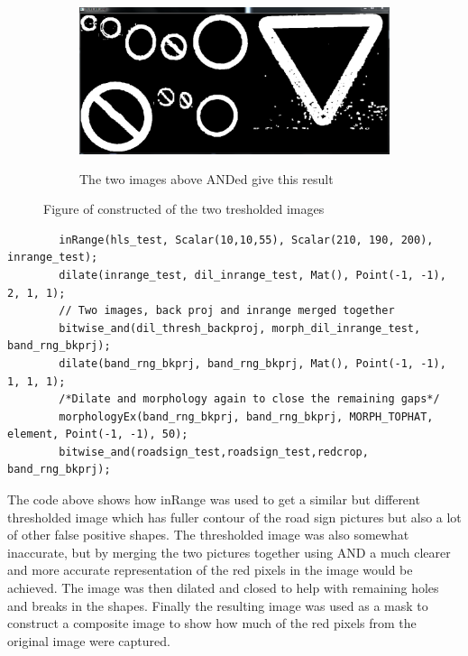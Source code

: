 \documentclass{article}
\begin{document}
\begin{figure}[H]
\center
\begin{subfigure}{0.5\textwidth}
\includegraphics[width=0.9\linewidth, height=5cm]{N_BIT_AND.PNG} 
\caption{The two images above ANDed give this result}
\label{fig:subim1}
\end{subfigure}
\caption{Figure of constructed of the two tresholded images}
\label{fig:image2}
\end{figure}


\begin{lstlisting}
		inRange(hls_test, Scalar(10,10,55), Scalar(210, 190, 200), inrange_test);
		dilate(inrange_test, dil_inrange_test, Mat(), Point(-1, -1), 2, 1, 1);
		// Two images, back proj and inrange merged together
		bitwise_and(dil_thresh_backproj, morph_dil_inrange_test, band_rng_bkprj);
		dilate(band_rng_bkprj, band_rng_bkprj, Mat(), Point(-1, -1), 1, 1, 1);
		/*Dilate and morphology again to close the remaining gaps*/
		morphologyEx(band_rng_bkprj, band_rng_bkprj, MORPH_TOPHAT, element, Point(-1, -1), 50);
		bitwise_and(roadsign_test,roadsign_test,redcrop, band_rng_bkprj);
\end{lstlisting}
The code above shows how inRange was used to get a similar but different thresholded image which has fuller contour of the road sign pictures but also a lot of other false positive shapes. The thresholded image was also somewhat inaccurate, but by merging the two pictures  together using AND a much clearer and more accurate representation of the red pixels in the image would be achieved. The image was then dilated and closed to help with remaining holes and breaks in the shapes. Finally the resulting image was used as a mask to construct a composite image to show how much of the red pixels from the original image were captured.
\end{document}

